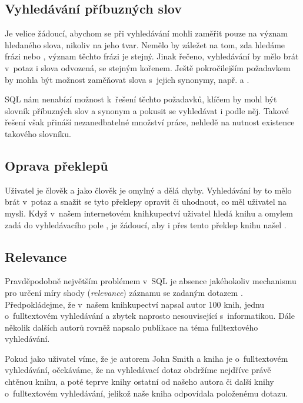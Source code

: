 \documentclass[11pt,oneside]{fithesis2}
\begin{document}
\subsection{Vyhledávání příbuzných slov}
Je velice žádoucí, abychom se při vyhledávání mohli zaměřit pouze na význam hledaného slova, nikoliv na jeho tvar. Nemělo by záležet na tom, zda hledáme frázi  nebo , význam těchto frázi
je stejný. Jinak řečeno, vyhledávání by mělo brát v~potaz i slova odvozená, se stejným kořenem. Ještě pokročilejším požadavkem by mohla být možnost zaměňovat slova s~jejich synonymy, např.  a  \cite[s.~10]{HibernateSearchAction}.

SQL nám nenabízí možnost k~řešení těchto požadavků, klíčem by mohl být slovník příbuzných slov a synonym a pokusit se vyhledávat i podle něj. Takové řešení však přináší nezanedbatelné množství práce, nehledě na nutnost existence takového slovníku.

\subsection{Oprava překlepů}
Uživatel je člověk a jako člověk je omylný a dělá chyby. Vyhledávání by to mělo brát v~potaz a snažit se tyto překlepy opravit či uhodnout, co měl uživatel na mysli. Když v~našem internetovém knihkupectví uživatel hledá knihu  a
omylem zadá do vyhledávacího pole , je žádoucí, aby i přes tento překlep knihu našel \cite[s.~10]{HibernateSearchAction}.

\subsection{Relevance}
Pravděpodobně největším problémem v~SQL je absence jakéhokoliv mechanismu pro určení míry shody (\emph{relevance}) záznamu se zadaným dotazem \cite[s.~10]{HibernateSearchAction}. Předpokládejme, že v~našem knihkupectví napsal autor  100 knih, jednu o~fulltextovém vyhledávání a 
zbytek naprosto nesouvisející s~informatikou. Dále několik dalších autorů rovněž napsalo publikace na téma fulltextového vyhledávání.

Pokud jako uživatel víme, že je autorem John Smith a kniha je o~fulltextovém vyhledávání, očekáváme, že na vyhledávací dotaz  obdržíme nejdříve právě chtěnou knihu, a poté teprve knihy ostatní od našeho autora či
další knihy o~fulltextovém vyhledávání, jelikož naše kniha  odpovídala položenému dotazu.
\end{document}
